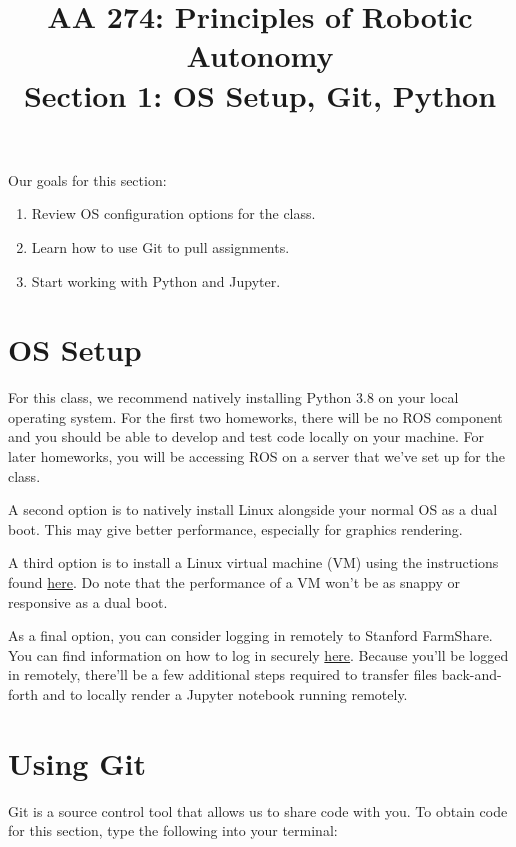 \documentclass{article}
\title{AA 274: Principles of Robotic Autonomy \\ Section 1: OS Setup, Git, Python}
\date{}
\begin{document}
\maketitle
\pagestyle{fancy}

Our goals for this section: \begin{enumerate}
    \item Review OS configuration options for the class.
    \item Learn how to use Git to pull assignments.
    \item Start working with Python and Jupyter.
\end{enumerate}

\section{OS Setup}
For this class, we recommend natively installing Python 3.8 on your local operating system. For the first two homeworks, there will be no ROS component and you should be able to develop and test code locally on your machine. For later homeworks, you will be accessing ROS on a server that we've set up for the class.


A second option is to natively install Linux alongside your normal OS as a dual boot. This may give better performance, especially for graphics rendering. %

A third option is to install a Linux virtual machine (VM) using the instructions found  \href{https://docs.google.com/document/d/1ley_pauriyx0PrH8XYfkIrZwXnL3s-xBQvcUY6RE02I/edit#}{here}. Do note that the performance of a VM won't be as snappy or responsive as a dual boot.

As a final option, you can consider logging in remotely to Stanford FarmShare. You can find information on how to log in securely \href{https://srcc.stanford.edu/farmshare2/connecting}{here}. Because you'll be logged in remotely, there'll be a few additional steps required to transfer files back-and-forth and to locally render a Jupyter notebook running remotely.

\section{Using Git}
Git is a source control tool that allows us to share code with you. To obtain code for this section, type the following into your terminal:
\end{document}
